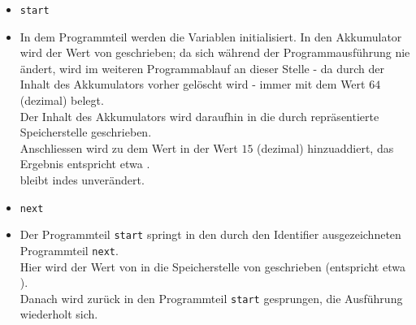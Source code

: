 \noindent
\begin{itemize}
    \itemsep0.5em
    \item \texttt{start}
    \item[] In dem Programmteil werden die Variablen initialisiert.
    In den Akkumulator  wird der Wert von  geschrieben; da sich  während der Programmausführung nie ändert, wird  im weiteren Programmablauf an dieser Stelle - da durch   der Inhalt des Akkumulators vorher gelöscht wird - immer mit dem Wert $64$ (dezimal) belegt.\\
    Der Inhalt des Akkumulators wird daraufhin in die durch  repräsentierte Speicherstelle geschrieben.\\
     Anschliessen wird zu dem Wert in  der Wert $15$ (dezimal) hinzuaddiert, das Ergebnis entspricht etwa .\\
     bleibt indes unverändert.
    \item \texttt{next}
    \item[] Der Programmteil \texttt{start} springt in den durch den Identifier ausgezeichneten Programmteil \texttt{next}.\\
    Hier wird der Wert von  in die Speicherstelle von  geschrieben (entspricht etwa ).\\
    Danach wird zurück in den Programmteil \texttt{start} gesprungen, die Ausführung wiederholt sich.
\end{itemize}